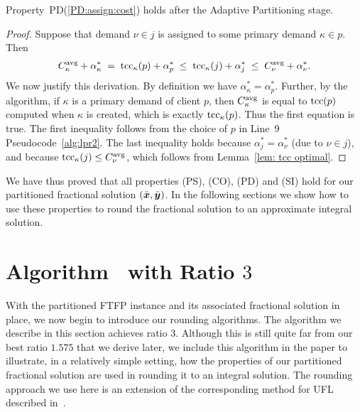 \documentclass[11pt]{article}
\begin{document}

\begin{lemma}\label{lem: PD:assign:cost holds}
Property~PD(\ref{PD:assign:cost}) holds after the Adaptive Partitioning stage.
\end{lemma}

\begin{proof}
Suppose that demand $\nu\in j$ is assigned to some primary demand $\kappa\in p$.
Then
%
\begin{eqnarray*}
 C^{{\mbox{\scriptsize\rm avg}}}_{\kappa} + \alpha_{\kappa}^\ast \;=\; \textrm{tcc}_\kappa(p) + \alpha^\ast_p
 					\;\le\; \textrm{tcc}_\kappa(j) + \alpha^\ast_j   
					\;\le\; C^{{\mbox{\scriptsize\rm avg}}}_{\nu} + \alpha^\ast_\nu.
\end{eqnarray*}
%
We now justify this derivation. By definition we have
$\alpha_{\kappa}^\ast = \alpha^\ast_p$.  Further, by the
algorithm, if $\kappa$ is a primary demand of client $p$,
then $C^{{\mbox{\scriptsize\rm avg}}}_{\kappa}$ is equal to $\textrm{tcc}(p)$ computed when
$\kappa$ is created, which is exactly $\textrm{tcc}_\kappa(p)$. Thus
the first equation is true. The first inequality follows
from the choice of $p$ in Line~9
Pseudocode~\ref{alg:lpr2}. The last inequality holds
because $\alpha^\ast_j = \alpha^\ast_\nu$ (due to $\nu\in
j$), and because $\textrm{tcc}_\kappa(j) \le C^{{\mbox{\scriptsize\rm avg}}}_{\nu}$, which
follows from Lemma~\ref{lem: tcc optimal}.
\end{proof}

We have thus proved that all properties (PS), (CO), (PD) and (SI) hold
for our partitioned fractional solution $(\bar{\boldsymbol{x}},\bar{\boldsymbol{y}})$. In the following
sections we show how to use these properties to round the fractional solution
to an approximate integral solution.


\section{Algorithm~{\EGUP} with Ratio $3$}
\label{sec: 3-approximation}

With the partitioned FTFP instance and its associated
fractional solution in place, we now begin to introduce our rounding algorithms.
The algorithm we describe in this section achieves ratio
$3$. Although this is still quite far from our best ratio $1.575$ that
we derive later, we include this algorithm in the paper to illustrate,
in a relatively simple setting, how the properties of our partitioned fractional
solution are used in rounding it to an integral solution.
The rounding approach we use here is an extension of the corresponding
method for UFL described in~\cite{gupta08}.
\end{document}
